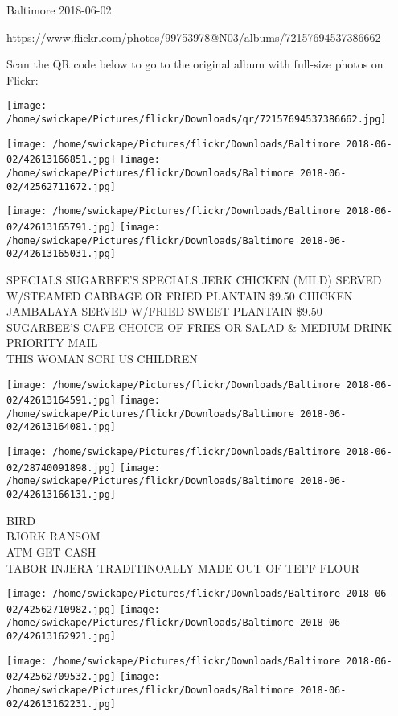 \documentclass[10pt,letterpaper]{article}
\begin{document}
Baltimore 2018-06-02

https://www.flickr.com/photos/99753978@N03/albums/72157694537386662

Scan the QR code below to go to the original album with full-size photos on Flickr:

\texttt{[image: /home/swickape/Pictures/flickr/Downloads/qr/72157694537386662.jpg]}
\pagebreak

\texttt{[image: /home/swickape/Pictures/flickr/Downloads/Baltimore 2018-06-02/42613166851.jpg]}
\texttt{[image: /home/swickape/Pictures/flickr/Downloads/Baltimore 2018-06-02/42562711672.jpg]}

\texttt{[image: /home/swickape/Pictures/flickr/Downloads/Baltimore 2018-06-02/42613165791.jpg]}
\texttt{[image: /home/swickape/Pictures/flickr/Downloads/Baltimore 2018-06-02/42613165031.jpg]}

SPECIALS SUGARBEE'S SPECIALS JERK CHICKEN (MILD) SERVED W/STEAMED CABBAGE OR FRIED PLANTAIN \$9.50 CHICKEN JAMBALAYA SERVED W/FRIED SWEET PLANTAIN \$9.50\\
SUGARBEE'S CAFE CHOICE OF FRIES OR SALAD \& MEDIUM DRINK\\
PRIORITY MAIL\\
THIS WOMAN SCRI US CHILDREN\\
\pagebreak

\texttt{[image: /home/swickape/Pictures/flickr/Downloads/Baltimore 2018-06-02/42613164591.jpg]}
\texttt{[image: /home/swickape/Pictures/flickr/Downloads/Baltimore 2018-06-02/42613164081.jpg]}

\texttt{[image: /home/swickape/Pictures/flickr/Downloads/Baltimore 2018-06-02/28740091898.jpg]}
\texttt{[image: /home/swickape/Pictures/flickr/Downloads/Baltimore 2018-06-02/42613166131.jpg]}

BIRD\\
BJORK RANSOM\\
ATM GET CASH\\
TABOR INJERA TRADITINOALLY MADE OUT OF TEFF FLOUR\\
\pagebreak

\texttt{[image: /home/swickape/Pictures/flickr/Downloads/Baltimore 2018-06-02/42562710982.jpg]}
\texttt{[image: /home/swickape/Pictures/flickr/Downloads/Baltimore 2018-06-02/42613162921.jpg]}

\texttt{[image: /home/swickape/Pictures/flickr/Downloads/Baltimore 2018-06-02/42562709532.jpg]}
\texttt{[image: /home/swickape/Pictures/flickr/Downloads/Baltimore 2018-06-02/42613162231.jpg]}
\end{document}
